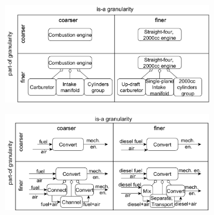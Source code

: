 \documentclass[
]{ceurart}
\begin{document}
\begin{figure}
    \centering
    \begin{subfigure}{0.49\textwidth}
    \includegraphics[width=\textwidth]{granularity-table-structural.png}
    \caption{}
    \label{fig:granularity-table-structural}
    \end{subfigure}
    \hfill
    \begin{subfigure}{0.49\textwidth}
    \includegraphics[width=\textwidth]{granularity-table-functional.png}

\end{subfigure}
\end{figure}
\end{document}
